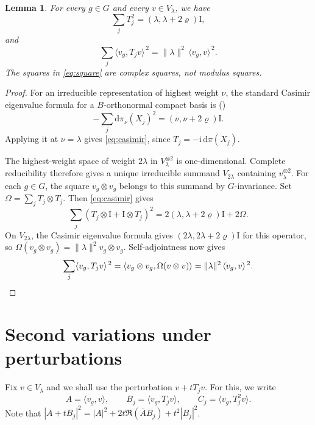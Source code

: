 \documentclass[11pt,reqno]{amsart}
\numberwithin{equation}{section}
\theoremstyle{plain}
\newtheorem{lemma}[theorem]{Lemma}
\theoremstyle{remark}
\newcommand{\rh}{\varrho}
\newcommand{\ii}{\mathrm i}
\newcommand{\Id}{\mathrm I}
\newcommand{\norm}[1]{\lVert#1\rVert}
\newcommand{\ip}[2]{\langle#1,#2\rangle}
\begin{document}
\begin{lemma}\label{lem:casimir}
For every $g\in G$ and every $v\in V_\lambda$, we have
\begin{equation}\label{eq:casimir}
 \sum_j T_j^2=(\lambda,\lambda+2\rh)\Id,
\end{equation}
and
\begin{equation}\label{eq:square}
 \sum_j\ip{v_g}{T_jv}^{\,2}=\norm{\lambda}^2\,\ip{v_g}{v}^{\,2}.
\end{equation}
The squares in \eqref{eq:square} are complex squares, not modulus squares.
\end{lemma}
\begin{proof}
For an irreducible representation of highest weight $\nu$, the
standard Casimir eigenvalue formula for a $B$-orthonormal compact
basis is (\cite[Proposition~5.28(b), p.~295]{Knapp})
\[
 -\sum_j\mathrm d\pi_\nu(X_j)^2
       =(\nu,\nu+2\rh)\Id.
\]
 Applying it at $\nu=\lambda$ gives
\eqref{eq:casimir}, since $T_j=-\ii\,\mathrm d\pi(X_j)$.

The highest-weight space of weight $2\lambda$ in $V_\lambda^{\otimes2}$
is one-dimensional.  Complete reducibility therefore gives a unique
irreducible summand $V_{2\lambda}$ containing $v_\lambda^{\otimes2}$.
For each $g\in G$, the square $v_g\otimes v_g$ belongs to this
summand by $G$-invariance.  Set
$\Omega=\sum_jT_j\otimes T_j$.  Then \eqref{eq:casimir} gives
\[
 \sum_j(T_j\otimes\Id+\Id\otimes T_j)^2=2(\lambda,\lambda+2\rh)\Id+2\Omega.
\]
On $V_{2\lambda}$, the Casimir eigenvalue formula gives
$(2\lambda,2\lambda+2\rh)\Id$ for this operator, so
$\Omega(v_g\otimes v_g)=\norm{\lambda}^2 v_g\otimes v_g$.  Self-adjointness now gives
\[
 \sum_j\ip{v_g}{T_jv}^{\,2}
 =\ip{v_g\otimes v_g}{\Omega(v\otimes v)}
 =\norm{\lambda}^2\,\ip{v_g}{v}^{\,2}. \qedhere
\]
\end{proof}

\section{Second variations under perturbations}\label{sec:variations}

Fix $v\in V_\lambda$ and we shall use the perturbation $v+tT_jv$. For this, we write
\[
 A=\ip{v_g}{v},\qquad B_j=\ip{v_g}{T_jv},\qquad C_j=\ip{v_g}{T_j^2v}.
\]
Note that
 $|A+tB_j|^2=|A|^2+2t\Re(\overline A B_j)+t^2|B_j|^2$.
\end{document}
